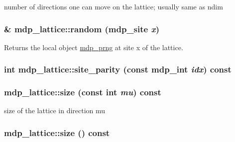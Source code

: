 number of directions one can move on the lattice; usually same as ndim \hypertarget{classmdp__lattice_a93f774075f5829c57009c644a74cfd4a}{
\subsubsection[{random}]{ \& mdp\_\-lattice::random ({\bf mdp\_\-site} {\em x})}}
\label{classmdp__lattice_a93f774075f5829c57009c644a74cfd4a}


Returns the local object \hyperlink{classmdp__prng}{mdp\_\-prng} at site x of the lattice. \hypertarget{classmdp__lattice_af8e8ea7660136dc3810b0a14a41b6505}{
\subsubsection[{site\_\-parity}]{\setlength{\rightskip}{0pt plus 5cm}int mdp\_\-lattice::site\_\-parity (const {\bf mdp\_\-int} {\em idx}) const}}
\label{classmdp__lattice_af8e8ea7660136dc3810b0a14a41b6505}
\hypertarget{classmdp__lattice_a08612798e2f61d4e9d2ccdc8b8d7cf37}{
\subsubsection[{size}]{ mdp\_\-lattice::size (const int {\em mu}) const}}
\label{classmdp__lattice_a08612798e2f61d4e9d2ccdc8b8d7cf37}


size of the lattice in direction mu \hypertarget{classmdp__lattice_a903ec2c7d662743f8bc1e311d21f6c21}{
\subsubsection[{size}]{ mdp\_\-lattice::size () const}}
\label{classmdp__lattice_a903ec2c7d662743f8bc1e311d21f6c21}



